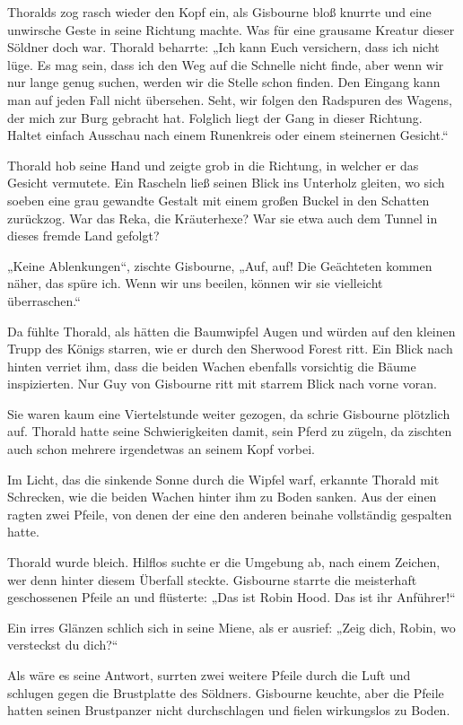 Thoralds zog rasch wieder den Kopf ein, als Gisbourne bloß knurrte und eine unwirsche Geste in seine Richtung machte. Was für eine grausame Kreatur dieser Söldner doch war. Thorald beharrte: „Ich kann Euch versichern, dass ich nicht lüge. Es mag sein, dass ich den Weg auf die Schnelle nicht finde, aber wenn wir nur lange genug suchen, werden wir die Stelle schon finden. Den Eingang kann man auf jeden Fall nicht übersehen. Seht, wir folgen den Radspuren des Wagens, der mich zur Burg gebracht hat. Folglich liegt der Gang in dieser Richtung. Haltet einfach Ausschau nach einem Runenkreis oder einem steinernen Gesicht.“

Thorald hob seine Hand und zeigte grob in die Richtung, in welcher er das Gesicht vermutete. Ein Rascheln ließ seinen Blick ins Unterholz gleiten, wo sich soeben eine grau gewandte Gestalt mit einem großen Buckel in den Schatten zurückzog. War das Reka, die Kräuterhexe? War sie etwa auch dem Tunnel in dieses fremde Land gefolgt?

„Keine Ablenkungen“, zischte Gisbourne, „Auf, auf! Die Geächteten kommen näher, das spüre ich. Wenn wir uns beeilen, können wir sie vielleicht überraschen.“

Da fühlte Thorald, als hätten die Baumwipfel Augen und würden auf den kleinen Trupp des Königs starren, wie er durch den Sherwood Forest ritt. Ein Blick nach hinten verriet ihm, dass die beiden Wachen ebenfalls vorsichtig die Bäume inspizierten. Nur Guy von Gisbourne ritt mit starrem Blick nach vorne voran.

Sie waren kaum eine Viertelstunde weiter gezogen, da schrie Gisbourne plötzlich auf. Thorald hatte seine Schwierigkeiten damit, sein Pferd zu zügeln, da zischten auch schon mehrere irgendetwas an seinem Kopf vorbei.

Im Licht, das die sinkende Sonne durch die Wipfel warf, erkannte Thorald mit Schrecken, wie die beiden Wachen hinter ihm zu Boden sanken. Aus der einen ragten zwei Pfeile, von denen der eine den anderen beinahe vollständig gespalten hatte.

Thorald wurde bleich. Hilflos suchte er die Umgebung ab, nach einem Zeichen, wer denn hinter diesem Überfall steckte. Gisbourne starrte die meisterhaft geschossenen Pfeile an und flüsterte: „Das ist Robin Hood. Das ist ihr Anführer!“

Ein irres Glänzen schlich sich in seine Miene, als er ausrief: „Zeig dich, Robin, wo versteckst du dich?“

Als wäre es seine Antwort, surrten zwei weitere Pfeile durch die Luft und schlugen gegen die Brustplatte des Söldners. Gisbourne keuchte, aber die Pfeile hatten seinen Brustpanzer nicht durchschlagen und fielen wirkungslos zu Boden.

